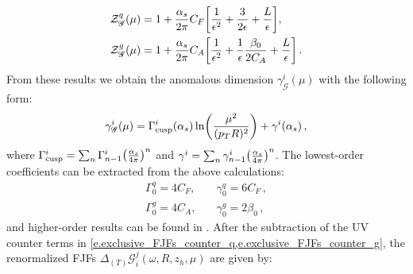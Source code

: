 \documentclass[a4paper, 11 pt]{article}
\begin{document}
\begin{align}
\mathcal{Z}_{\mathscr{G}}^q (\mu)
& =
1 + \frac{\alpha _s}{2 \pi} C_F \bqty{\frac{1}{\epsilon^2}+\frac{3}{2 \epsilon}+\frac{L}{\epsilon}} , \label{e.exclusive_FJFs_counter_q} \\
\mathcal{Z}_{\mathscr{G}}^g (\mu)
& =
1 + \frac{\alpha _s}{2 \pi} C_A \bqty{\frac{1}{\epsilon^2} + \frac{1}{\epsilon} \frac{\beta _0}{2 C_A} + \frac{L}{\epsilon}}\, . \label{e.exclusive_FJFs_counter_g}
\end{align}
From these results we obtain the anomalous dimension $\gamma _{\mathscr{G}}^i (\mu)$ with the following form:
\begin{align}
\gamma _{\mathscr{G}}^i(\mu)
=
\Gamma _{\text{cusp}}^i \pqty{\alpha _s} \ln(\frac{\mu^2}{(p_TR)^2})
+
\gamma ^i \pqty{\alpha _s}\,,
\end{align}
where $\Gamma _{\text{cusp}}^i = \sum _n \Gamma _{n-1}^i \pqty{\frac{\alpha _s}{4 \pi}}^n$ and $\gamma ^i = \sum _n \gamma _{n-1}^i \pqty{\frac{\alpha _s}{4 \pi}}^n$.
The lowest-order coefficients can be extracted from the above calculations:
\begin{align}
\Gamma _0^q = 4 C_F, & \quad \gamma _0^q = 6 C_F
\, , \\
\Gamma _0^g = 4 C_A, & \quad \gamma _0^g = 2 \beta _0
\, ,
\end{align}
and higher-order results can be found in \cite{Jain:2011xz, Becher:2006mr, Becher:2009th, Echevarria:2012pw, Moch:2004pa}.
After the subtraction of the UV counter terms in \cref{e.exclusive_FJFs_counter_q,e.exclusive_FJFs_counter_g}, the renormalized FJFs $\Delta _{(T)}\mathscr{G}_i^j (\omega, R, z_h, \mu)$ are given by:
\begingroup
\allowdisplaybreaks
\end{document}
